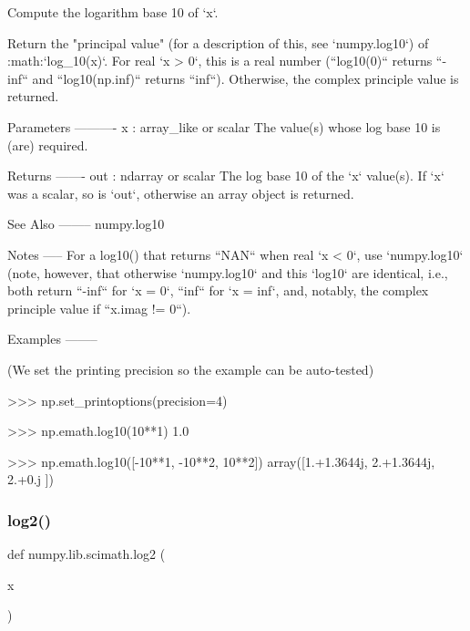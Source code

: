 \begin{DoxyVerb}Compute the logarithm base 10 of `x`.

Return the "principal value" (for a description of this, see
`numpy.log10`) of :math:`log_{10}(x)`. For real `x > 0`, this
is a real number (``log10(0)`` returns ``-inf`` and ``log10(np.inf)``
returns ``inf``). Otherwise, the complex principle value is returned.

Parameters
----------
x : array_like or scalar
   The value(s) whose log base 10 is (are) required.

Returns
-------
out : ndarray or scalar
   The log base 10 of the `x` value(s). If `x` was a scalar, so is `out`,
   otherwise an array object is returned.

See Also
--------
numpy.log10

Notes
-----
For a log10() that returns ``NAN`` when real `x < 0`, use `numpy.log10`
(note, however, that otherwise `numpy.log10` and this `log10` are
identical, i.e., both return ``-inf`` for `x = 0`, ``inf`` for `x = inf`,
and, notably, the complex principle value if ``x.imag != 0``).

Examples
--------

(We set the printing precision so the example can be auto-tested)

>>> np.set_printoptions(precision=4)

>>> np.emath.log10(10**1)
1.0

>>> np.emath.log10([-10**1, -10**2, 10**2])
array([1.+1.3644j, 2.+1.3644j, 2.+0.j    ])\end{DoxyVerb}
 \mbox{\label{namespacenumpy_1_1lib_1_1scimath_a7ad3798370da0c475531cd6fa59a64f1}} 
\subsubsection{\texorpdfstring{log2()}{log2()}}
{\footnotesize\ttfamily def numpy.\+lib.\+scimath.\+log2 (\begin{DoxyParamCaption}\item[{}]{x }\end{DoxyParamCaption})}

